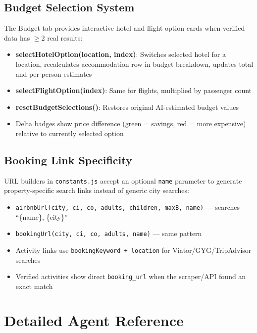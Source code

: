 \documentclass[11pt,a4paper]{article}
\begin{document}
\subsection{Budget Selection System}

The Budget tab provides interactive hotel and flight option cards when verified data has $\geq$2 real results:

\begin{itemize}
\item \textbf{selectHotelOption(location, index)}: Switches selected hotel for a location, recalculates accommodation row in budget breakdown, updates total and per-person estimates
\item \textbf{selectFlightOption(index)}: Same for flights, multiplied by passenger count
\item \textbf{resetBudgetSelections()}: Restores original AI-estimated budget values
\item Delta badges show price difference (green = savings, red = more expensive) relative to currently selected option
\end{itemize}

\subsection{Booking Link Specificity}

URL builders in \texttt{constants.js} accept an optional \texttt{name} parameter to generate property-specific search links instead of generic city searches:

\begin{itemize}
\item \texttt{airbnbUrl(city, ci, co, adults, children, maxB, name)} --- searches ``\{name\}, \{city\}''
\item \texttt{bookingUrl(city, ci, co, adults, name)} --- same pattern
\item Activity links use \texttt{bookingKeyword + location} for Viator/GYG/TripAdvisor searches
\item Verified activities show direct \texttt{booking\_url} when the scraper/API found an exact match
\end{itemize}

\newpage
\appendix
\section{Detailed Agent Reference}
\end{document}
